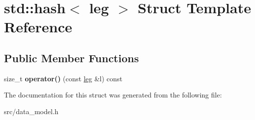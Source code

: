 \hypertarget{structstd_1_1hash_3_01leg_01_4}{}\section{std\+:\+:hash$<$ leg $>$ Struct Template Reference}
\label{structstd_1_1hash_3_01leg_01_4}
\subsection*{Public Member Functions}
\begin{DoxyCompactItemize}
\item 
\mbox{\label{structstd_1_1hash_3_01leg_01_4_ae0aff468b8cdeac8d5a1fab1eed668c8}} 
size\+\_\+t {\bfseries operator()} (const \hyperlink{structleg}{leg} \&l) const
\end{DoxyCompactItemize}


The documentation for this struct was generated from the following file\+:\begin{DoxyCompactItemize}
\item 
src/data\+\_\+model.\+h\end{DoxyCompactItemize}
